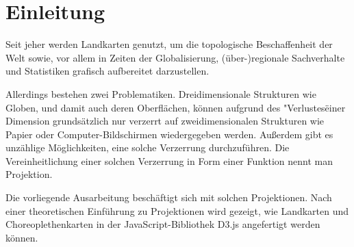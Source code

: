 
\chapter{Einleitung}
\label{ch:introduction}

Seit jeher werden Landkarten genutzt, um die topologische Beschaffenheit der Welt sowie, vor allem in Zeiten der Globalisierung, (über-)regionale Sachverhalte und Statistiken grafisch aufbereitet darzustellen.

Allerdings bestehen zwei Problematiken. Dreidimensionale Strukturen wie Globen, und damit auch deren Oberflächen, können aufgrund des "Verlustes\" einer Dimension grundsätzlich nur verzerrt auf zweidimensionalen Strukturen wie Papier oder Computer-Bildschirmen wiedergegeben werden. Außerdem gibt es unzählige Möglichkeiten, eine solche Verzerrung durchzuführen. Die Vereinheitlichung einer solchen Verzerrung in Form einer Funktion nennt man Projektion.

Die vorliegende Ausarbeitung beschäftigt sich mit solchen Projektionen. Nach einer theoretischen Einführung zu Projektionen wird gezeigt, wie Landkarten und Choreoplethenkarten in der JavaScript-Bibliothek D3.js angefertigt werden können.
